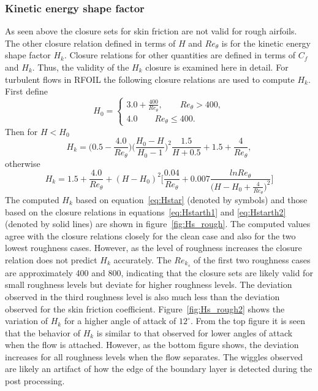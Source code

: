 \subsubsection{Kinetic energy shape factor}
As seen above the closure sets for skin friction are not valid for rough airfoils. The other closure relation defined in terms of $H$ and $Re_{\theta}$ is for the kinetic energy shape factor $H_k$. Closure relations for other quantities are defined in terms of $C_f$ and $H_k$. Thus, the validity of the $H_k$ closure is examined here in detail.
For turbulent flows in RFOIL the following closure relations are used to compute $H_k$. First define 
\begin{equation}
H_0 = 
\begin{cases}
 3.0 + \frac{400}{Re_{\theta}},\qquad Re_{\theta} > 400, \\
 4.0 \qquad Re_{\theta} \leq 400.
 \end{cases}
\end{equation}
Then for $H< H_0$
\begin{equation}
H_k = \bigg(0.5 - \frac{4.0}{Re_{\theta}}\bigg)\bigg(\frac{H_0-H}{H_0-1}\bigg)^2\frac{1.5}{H+0.5}+1.5+\frac{4}{Re_{\theta}},
\label{eq:Hstarth1}
\end{equation}
otherwise
\begin{equation}
H_k = 1.5 + \frac{4.0}{Re_{\theta}}+(H-H_0)^2\bigg[\frac{0.04}{Re_{\theta}}+ 0.007\frac{ln Re_{\theta}}{\big(H-H_0+\frac{4}{Re_{\theta}}\big)^2}\bigg]
\label{eq:Hstarth2}
\end{equation}
The computed $H_k$ based on equation~\ref{eq:Hstar} (denoted by symbols) and those based on the closure relations in equations~\ref{eq:Hstarth1} and \ref{eq:Hstarth2} (denoted by solid lines) are shown in figure~\ref{fig:Hs_rough}. The computed values agree with the closure relations closely for the clean case and also for the two lowest roughness cases. However, as the level of roughness increases the closure relation does not predict $H_k$ accurately. The $Re_{k_s}$ of the first two roughness cases are approximately 400 and 800, indicating that the closure sets are likely valid for small roughness levels but deviate for higher roughness levels. The deviation observed in the third roughness level is also much less than the deviation observed for the skin friction coefficient. Figure~\ref{fig:Hs_rough2} shows the variation of $H_k$ for a higher angle of attack of $12^{\circ}$. From the top figure it is seen that the behavior of $H_k$ is similar to that observed for lower angles of attack when the flow is attached. However, as the bottom figure shows, the deviation increases for all roughness levels when the flow separates. The wiggles observed are likely an artifact of how the edge of the boundary layer is detected during the post processing. 
